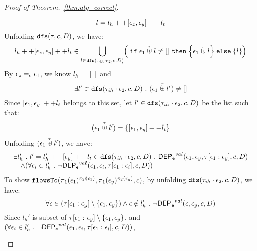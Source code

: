 \documentclass[a4paper,11pt]{article}
\begin{document}
\begin{proof}[Proof of Theorem.~\ref{thm:alg_correct}]
\begin{case}
\begin{subcase}
\begin{subsubcase}
\[  l = l_h ++ [\mathtt{\epsilon}_z, \mathtt{\epsilon}_y] ++ l_t 
\]
%
Unfolding $\mathtt{dfs}(\mathtt{\tau}, c, D)$, we have:
%
\[
  l_h ++ [\event_z, \event_y] ++ l_t  \in 
     \bigcup\limits_{l \in \kw{dfs}(\trace_{ih} \cdot \event_2, c, D) }
  \left(  \eif \event_1 \stackrel{\trace}{\uplus} l \neq [] 
  \ethen \left\{ \event_1 \stackrel{\trace}{\uplus} l \right\} \eelse \left\{ l \right\}
  \right)
  \]
By $\mathtt{\epsilon}_z =_{\mathtt{e}} \mathtt{\epsilon}_1$, we know $l_h = []$ and 
%
\[
\begin{array}{l}
  \exists l' \in \mathtt{dfs}(\mathtt{\tau}_{ih}\cdot \mathtt{\epsilon}_2, c, D) ~.~
   (\mathtt{\epsilon}_1 \stackrel{\mathtt{\tau}}{\uplus} l') \neq []
\end{array}
\]
%
Since $[\mathtt{\epsilon}_1, \mathtt{\epsilon}_y] ++ l_t $ belongs to this set, let $l' \in \mathtt{dfs}(\mathtt{\tau}_{ih}\cdot \mathtt{\epsilon}_2, c, D)$ be the list such that:
\[
\begin{array}{l}
   (\mathtt{\epsilon}_1 \stackrel{\mathtt{\tau}}{\uplus} l') = \{[\mathtt{\epsilon}_1, \mathtt{\epsilon}_y] ++ l_t\}
\end{array}
\]
%
Unfolding $(\mathtt{\epsilon}_1 \stackrel{\mathtt{\tau}}{\uplus} l') $, we have:
\[
\begin{array}{l}
  \exists l_{h}' ~.~ l' = l_{h}' ++ [\mathtt{\epsilon}_y] ++ l_t \in \mathtt{dfs}(\mathtt{\tau}_{ih}\cdot \mathtt{\epsilon}_2, c, D) ~.~
  \mathsf{DEP_{\mathtt{e}}}^{val}(\mathtt{\epsilon}_1, \mathtt{\epsilon}_y, \mathtt{\tau}[\mathtt{\epsilon}_1:\mathtt{\epsilon}_y], c, D)
  \\ \quad \land 
  (\forall \mathtt{\epsilon}_i \in l_{h}' ~.~ \neg \mathsf{DEP_{\mathtt{e}}}^{val} (\mathtt{\epsilon}_1, \mathtt{\epsilon}_i, \mathtt{\tau}[\mathtt{\epsilon}_1: \mathtt{\epsilon}_i], c, D))
\end{array}
\]
%
%
To show $\mathtt{flowsTo}(\pi_1(\mathtt{\epsilon}_1)^{\pi_2(\mathtt{\epsilon}_1)}, \pi_1(\mathtt{\epsilon}_y)^{\pi_2(\mathtt{\epsilon}_y)}, c)$, 
%
by unfolding $\mathtt{dfs}(\mathtt{\tau}_{ih}\cdot \mathtt{\epsilon}_2, c, D) $, we have:
\[
  \forall \mathtt{\epsilon} \in (\mathtt{\tau}[\mathtt{\epsilon}_1:\mathtt{\epsilon}_y]\setminus \{\mathtt{\epsilon}_1, \mathtt{\epsilon}_y\}) 
 \land \mathtt{\epsilon} \notin l_h' 
 ~.~ 
 \neg \mathsf{DEP_{\mathtt{e}}}^{val} (\mathtt{\epsilon}, \mathtt{\epsilon}_y, c, D)
\]
%
Since $l_{h}'$ is subset of $\mathtt{\tau}[\mathtt{\epsilon}_1:\mathtt{\epsilon}_y] \setminus \{\mathtt{\epsilon}_1, \mathtt{\epsilon}_y\}$, and $(\forall \mathtt{\epsilon}_i \in l_{h}' ~.~ \neg \mathsf{DEP_{\mathtt{e}}}^{val} (\mathtt{\epsilon}_1, \mathtt{\epsilon}_i, \mathtt{\tau}[\mathtt{\epsilon}_1: \mathtt{\epsilon}_i], c, D))$,

\end{subsubcase}
\end{subcase}
\end{case}
\end{proof}
\end{document}

